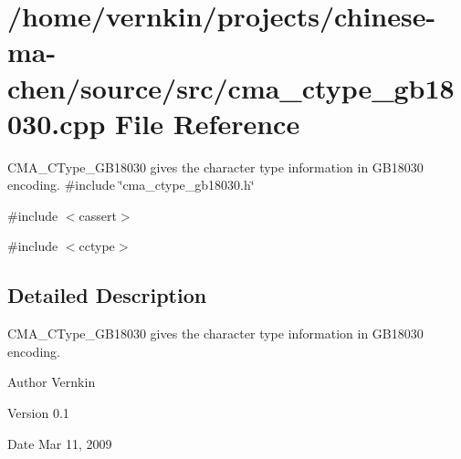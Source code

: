 \section{/home/vernkin/projects/chinese-\/ma-\/chen/source/src/cma\_\-ctype\_\-gb18030.cpp File Reference}
\label{cma__ctype__gb18030_8cpp}


CMA\_\-CType\_\-GB18030 gives the character type information in GB18030 encoding.  
{\ttfamily \#include \char`\"{}cma\_\-ctype\_\-gb18030.h\char`\"{}}\par
{\ttfamily \#include $<$cassert$>$}\par
{\ttfamily \#include $<$cctype$>$}\par


\subsection{Detailed Description}
CMA\_\-CType\_\-GB18030 gives the character type information in GB18030 encoding. \begin{DoxyAuthor}{Author}
Vernkin 
\end{DoxyAuthor}
\begin{DoxyVersion}{Version}
0.1 
\end{DoxyVersion}
\begin{DoxyDate}{Date}
Mar 11, 2009 
\end{DoxyDate}
